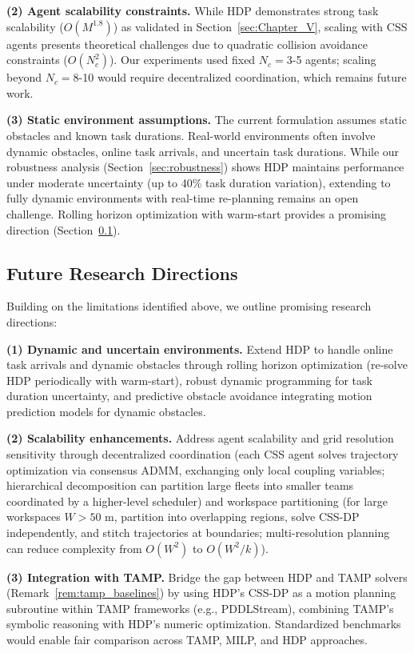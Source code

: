 \documentclass[manuscript,screen,review]{acmart}
\begin{document}
\textbf{(2) Agent scalability constraints.} While HDP demonstrates strong
task scalability ($O(M^{1.8})$) as validated in Section~\ref{sec:Chapter_V}, 
scaling with CSS agents presents theoretical challenges due to quadratic 
collision avoidance constraints ($O(N_c^2)$). Our experiments used fixed 
$N_c = 3$-5 agents; scaling beyond $N_c = 8$-10 would require decentralized 
coordination, which remains future work.

\textbf{(3) Static environment assumptions.} The current formulation assumes 
static obstacles and known task durations. Real-world environments often involve 
dynamic obstacles, online task arrivals, and uncertain task durations. While 
our robustness analysis (Section~\ref{sec:robustness}) shows HDP maintains 
performance under moderate uncertainty (up to 40\% task duration variation), 
extending to fully dynamic environments with real-time re-planning remains an 
open challenge. Rolling horizon optimization with warm-start provides a 
promising direction (Section~\ref{sec:future_work}).

\subsection{Future Research Directions}
\label{sec:future_work}
Building on the limitations identified above, we outline promising research 
directions:

\textbf{(1) Dynamic and uncertain environments.} Extend HDP to handle online 
task arrivals and dynamic obstacles through rolling horizon optimization 
(re-solve HDP periodically with warm-start), robust dynamic programming for 
task duration uncertainty, and predictive obstacle avoidance integrating motion prediction models for dynamic obstacles.

\textbf{(2) Scalability enhancements.} Address agent scalability and grid 
resolution sensitivity through decentralized coordination (each CSS agent solves 
trajectory optimization via consensus ADMM, exchanging 
only local coupling variables; hierarchical decomposition can partition large 
fleets into smaller teams coordinated by a higher-level scheduler) and workspace 
partitioning (for large workspaces $W > 50$ m, partition into overlapping regions, 
solve CSS-DP independently, and stitch trajectories at boundaries; multi-resolution 
planning can reduce complexity from $O(W^2)$ to $O(W^2/k)$).

\textbf{(3) Integration with TAMP.} Bridge the gap between HDP and TAMP solvers 
(Remark~\ref{rem:tamp_baselines}) by using HDP's CSS-DP as a motion planning 
subroutine within TAMP frameworks (e.g., PDDLStream), 
combining TAMP's symbolic reasoning with HDP's numeric optimization. Standardized 
benchmarks would enable fair comparison across TAMP, MILP, and HDP approaches.
\end{document}

